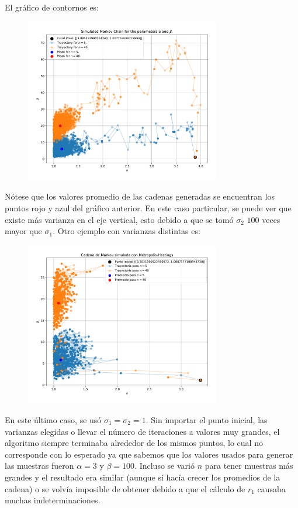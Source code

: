 El gráfico de contornos es:
\begin{figure}[h!]
	\centering
	\includegraphics[width=0.76\textwidth]{IMAGENES/ex1/trayectory_ex1.pdf}
\end{figure}

Nótese que los valores promedio de las cadenas generadas se encuentran los puntos rojo y azul del gráfico anterior. En este caso particular, se puede ver que existe más varianza en el eje vertical, esto debido a que se tomó $\sigma_2$ $100$ veces mayor que $\sigma_1$. Otro ejemplo con varianzas distintas es:
\begin{figure}[h!]
	\centering
	\includegraphics[width=0.76\textwidth]{IMAGENES/ejer12.pdf}
\end{figure}

En este último caso, se usó $\sigma_1=\sigma_2=1$. Sin importar el punto inicial, las varianzas elegidas o llevar el número de iteraciones a valores muy grandes, el algoritmo siempre terminaba alrededor de los mismos puntos, lo cual no corresponde con lo esperado ya que sabemos que los valores usados para generar las muestras fueron $\alpha=3$ y $\beta=100$. Incluso se varió $n$ para tener muestras más grandes y el resultado era similar (aunque sí hacía crecer los promedios de la cadena) o se volvía imposible de obtener debido a que el cálculo de $r_1$ causaba muchas indeterminaciones.